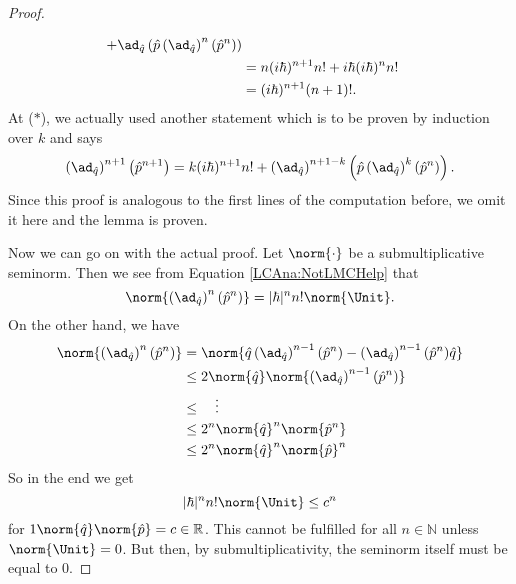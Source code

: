 \begin{proof}
\begin{subproof}
\begin{align*}
			+
			\ad_{\hat{q}}
			\left(
				\hat{p}
				\left( \ad_{\hat{q}} \right)^n
				\left( \hat{p}^n \right)
			\right)
			\\
			& =
			n (i \hbar)^{n+1} n!
			+
			i \hbar (i \hbar)^n n!
			\\
			& =
			(i \hbar)^{n + 1} (n + 1)!.
		\end{align*}
		At ($*$), we actually used another statement which is to be 
		proven by induction over $k$ and says
		\begin{equation*}
			\left( \ad_{\hat{q}} \right)^{n + 1}
			\left( \hat{p}^{n + 1} \right)
			=
			k (i \hbar)^{n + 1} n!
			+
			\left( \ad_{\hat{q}} \right)^{n + 1 - k}
			\left(
				\hat{p}
				\left( \ad_{\hat{q}} \right)^k
				\left( \hat{p}^n \right)
			\right).
		\end{equation*}
		Since this proof is analogous to the first lines of the 
		computation before, we omit it here and the lemma is proven.
	\end{subproof}	
	Now we can go on with the actual proof. Let $\norm{\cdot}$ be a 
	submultiplicative seminorm. Then we see from Equation 
	\eqref{LCAna:NotLMCHelp} that
	\begin{equation*}
		\norm{
			\left( \ad_{\hat{q}} \right)^n
			(\hat{p}^n)
		}
		=
		|\hbar|^n n! \norm{ \Unit }.
	\end{equation*}
	On the other hand, we have
	\begin{align*}
		\norm{
			\left( \ad_{\hat{q}} \right)^n
			(\hat{p}^n)
		}
		& =
		\norm{
			\hat{q}
			\left( \ad_{\hat{q}} \right)^{n-1}
			(\hat{p}^n)
			-
			\left( \ad_{\hat{q}} \right)^{n-1}
			(\hat{p}^n)
			\hat{q}
		}
		\\
		& \leq
		2 \norm{\hat{q}}
		\norm{
			\left( \ad_{\hat{q}} \right)^{n-1}
			(\hat{p}^n)
		}
		\\
		& \leq
		\quad \vdots
		\\
		& \leq
		2^n \norm{\hat{q}}^n
		\norm{ \hat{p}^n }
		\\
		& \leq
		2^n 
		\norm{\hat{q}}^n
		\norm{\hat{p}}^n
	\end{align*}
	So in the end we get
	\begin{equation*}
		|\hbar|^n n! \norm{ \Unit }
		\leq
		c^n
	\end{equation*}
	for $1 \norm{\hat q} \norm{\hat p} = c \in \mathbb{R}$. This cannot be 
	fulfilled for all $n \in \mathbb{N}$ unless $\norm{ \Unit } = 0$. But 
	then, by submultiplicativity, the seminorm itself must be equal to $0$.
\end{proof}
